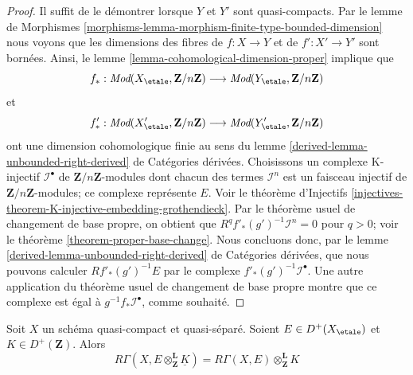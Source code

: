 \begin{proof}
Il suffit de le démontrer lorsque $Y$ et $Y'$ sont quasi-compacts.
Par le lemme de Morphismes
\ref{morphisms-lemma-morphism-finite-type-bounded-dimension}
nous voyons que les dimensions des fibres de
$f : X \to Y$ et de $f' : X' \to Y'$ sont bornées. Ainsi, le
lemme \ref{lemma-cohomological-dimension-proper} implique que
$$
f_* :
\textit{Mod}(X_\etale, \mathbf{Z}/n\mathbf{Z})
\longrightarrow
\textit{Mod}(Y_\etale, \mathbf{Z}/n\mathbf{Z})
$$
et
$$
f'_* :
\textit{Mod}(X'_\etale, \mathbf{Z}/n\mathbf{Z})
\longrightarrow
\textit{Mod}(Y'_\etale, \mathbf{Z}/n\mathbf{Z})
$$
ont une dimension cohomologique finie au sens du
lemme \ref{derived-lemma-unbounded-right-derived} de Catégories dérivées.
Choisissons un complexe K-injectif $\mathcal{I}^\bullet$
de $\mathbf{Z}/n\mathbf{Z}$-modules dont chacun des
termes $\mathcal{I}^n$ est un faisceau injectif de
$\mathbf{Z}/n\mathbf{Z}$-modules; ce complexe représente $E$.
Voir le théorème d'Injectifs
\ref{injectives-theorem-K-injective-embedding-grothendieck}.
Par le théorème usuel de changement de base propre, on obtient
que $R^qf'_*(g')^{-1}\mathcal{I}^n = 0$ pour $q > 0$; voir le
théorème \ref{theorem-proper-base-change}.
Nous concluons donc, par le
lemme \ref{derived-lemma-unbounded-right-derived} de Catégories dérivées,
que nous pouvons calculer $Rf'_*(g')^{-1}E$ par le complexe
$f'_*(g')^{-1}\mathcal{I}^\bullet$. Une autre application
du théorème usuel de changement de base propre montre que
ce complexe est égal à $g^{-1}f_*\mathcal{I}^\bullet$, comme souhaité.
\end{proof}

\begin{lemma}
\label{lemma-pull-out-constant}
Soit $X$ un schéma quasi-compact et quasi-séparé.
Soient $E \in D^+(X_\etale)$ et $K \in D^+(\mathbf{Z})$.
Alors
$$
R\Gamma(X, E \otimes_\mathbf{Z}^\mathbf{L} \underline{K}) =
R\Gamma(X, E) \otimes_\mathbf{Z}^\mathbf{L} K
$$
\end{lemma}

